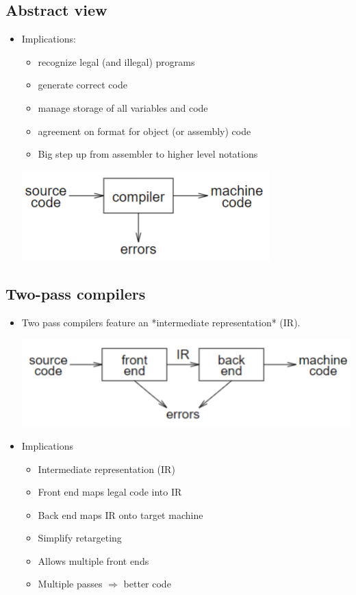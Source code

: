 \documentclass[10pt]{article}
\begin{document}
\subsection*{Abstract view}
\begin{itemize}
    \item Implications:
    \begin{itemize}
        \item recognize legal (and illegal) programs
        \item generate correct code
        \item manage storage of all variables and code
        \item agreement on format for object (or assembly) code
        \item Big step up from assembler to higher level notations
    \end{itemize}
    \begin{center}
        \includegraphics*[scale=1]{W1_1.png}
    \end{center}
\end{itemize}
\subsection*{Two-pass compilers}
\begin{itemize}
    \item Two pass compilers feature an *intermediate representation* (IR).
    \begin{center}
        \includegraphics*[scale=1]{W1_2.png}
    \end{center}
    \item Implications
    \begin{itemize}
        \item Intermediate representation (IR)
        \item Front end maps legal code into IR
        \item Back end maps IR onto target machine
        \item Simplify retargeting
        \item Allows multiple front ends
        \item Multiple passes $\Rightarrow$ better code
    \end{itemize}
\end{itemize}
\end{document}
